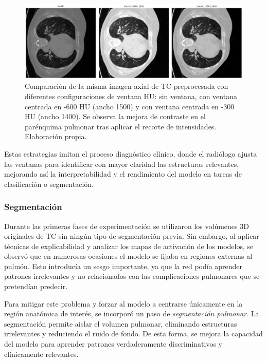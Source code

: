 \begin{figure}[!htbp]
    \centering
    \includegraphics[width=1\textwidth]{img/hu_ejemplos.png}
    \caption{Comparación de la misma imagen axial de TC preprocesada con diferentes configuraciones de ventana HU: sin ventana, con ventana centrada en -600 HU (ancho 1500) y con ventana centrada en -300 HU (ancho 1400). Se observa la mejora de contraste en el parénquima pulmonar tras aplicar el recorte de intensidades. Elaboración propia.}
    \label{fig:hu-ejemplo}
\end{figure}

Estas estrategias imitan el proceso diagnóstico clínico, donde el radiólogo ajusta las ventanas para identificar con mayor claridad las estructuras relevantes, mejorando así la interpretabilidad y el rendimiento del modelo en tareas de clasificación o segmentación.

\subsubsection{Segmentación}

Durante las primeras fases de experimentación se utilizaron los volúmenes 3D originales de TC sin ningún tipo de segmentación previa. Sin embargo, al aplicar técnicas de explicabilidad y analizar los mapas de activación de los modelos, se observó que en numerosas ocasiones el modelo se fijaba en regiones externas al pulmón. Esto introducía un sesgo importante, ya que la red podía aprender patrones irrelevantes y no relacionados con las complicaciones pulmonares que se pretendían predecir.

Para mitigar este problema y forzar al modelo a centrarse únicamente en la región anatómica de interés, se incorporó un paso de \textit{segmentación pulmonar}. La segmentación permite aislar el volumen pulmonar, eliminando estructuras irrelevantes y reduciendo el ruido de fondo. De esta forma, se mejora la capacidad del modelo para aprender patrones verdaderamente discriminativos y clínicamente relevantes.

